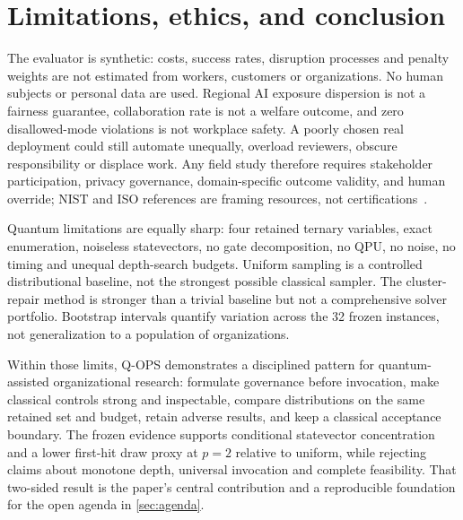 \section{Limitations, ethics, and conclusion}
\label{sec:limitations}

The evaluator is synthetic: costs, success rates, disruption processes and penalty weights are not estimated from workers, customers or organizations. No human subjects or personal data are used. Regional AI exposure dispersion is not a fairness guarantee, collaboration rate is not a welfare outcome, and zero disallowed-mode violations is not workplace safety. A poorly chosen real deployment could still automate unequally, overload reviewers, obscure responsibility or displace work. Any field study therefore requires stakeholder participation, privacy governance, domain-specific outcome validity, and human override; NIST and ISO references are framing resources, not certifications~\citep{nist2023airmf,iso42001,iso23894}.

Quantum limitations are equally sharp: four retained ternary variables, exact enumeration, noiseless statevectors, no gate decomposition, no QPU, no noise, no timing and unequal depth-search budgets. Uniform sampling is a controlled distributional baseline, not the strongest possible classical sampler. The cluster-repair method is stronger than a trivial baseline but not a comprehensive solver portfolio. Bootstrap intervals quantify variation across the 32 frozen instances, not generalization to a population of organizations.

Within those limits, Q-OPS demonstrates a disciplined pattern for quantum-assisted organizational research: formulate governance before invocation, make classical controls strong and inspectable, compare distributions on the same retained set and budget, retain adverse results, and keep a classical acceptance boundary. The frozen evidence supports conditional statevector concentration and a lower first-hit draw proxy at $p=2$ relative to uniform, while rejecting claims about monotone depth, universal invocation and complete feasibility. That two-sided result is the paper's central contribution and a reproducible foundation for the open agenda in \cref{sec:agenda}.

